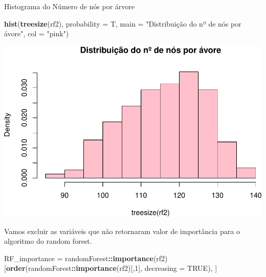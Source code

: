 \documentclass[]{article}
\newenvironment{Shaded}{\begin{snugshade}}{\end{snugshade}}
\newcommand{\KeywordTok}[1]{\textcolor[rgb]{0.13,0.29,0.53}{\textbf{#1}}}
\newcommand{\DataTypeTok}[1]{\textcolor[rgb]{0.13,0.29,0.53}{#1}}
\newcommand{\DecValTok}[1]{\textcolor[rgb]{0.00,0.00,0.81}{#1}}
\newcommand{\StringTok}[1]{\textcolor[rgb]{0.31,0.60,0.02}{#1}}
\newcommand{\CommentTok}[1]{\textcolor[rgb]{0.56,0.35,0.01}{\textit{#1}}}
\newcommand{\OtherTok}[1]{\textcolor[rgb]{0.56,0.35,0.01}{#1}}
\newcommand{\OperatorTok}[1]{\textcolor[rgb]{0.81,0.36,0.00}{\textbf{#1}}}
\newcommand{\NormalTok}[1]{#1}
\begin{document}
Histograma do Número de nós por árvore

\begin{Shaded}
\begin{Highlighting}[]
\KeywordTok{hist}\NormalTok{(}\KeywordTok{treesize}\NormalTok{(rf2), }\DataTypeTok{probability =}\NormalTok{ T,}
     \DataTypeTok{main =} \StringTok{"Distribuição do nº de nós por ávore"}\NormalTok{,}
     \DataTypeTok{col =} \StringTok{"pink"}\NormalTok{)}
\end{Highlighting}
\end{Shaded}

\includegraphics{markdown_v42_files/figure-latex/unnamed-chunk-92-1.pdf}

Vamos excluir as variáveis que não retornaram valor de importância para
o algoritmo do random forest.

\begin{Shaded}
\begin{Highlighting}[]
\NormalTok{RF_importance =}\StringTok{ }\NormalTok{randomForest}\OperatorTok{::}\KeywordTok{importance}\NormalTok{(rf2)[}\KeywordTok{order}\NormalTok{(randomForest}\OperatorTok{::}\KeywordTok{importance}\NormalTok{(rf2)[,}\DecValTok{1}\NormalTok{], }\DataTypeTok{decreasing =} \OtherTok{TRUE}\NormalTok{), ]}
\end{Highlighting}
\end{Shaded}

\begin{Shaded}
\end{Shaded}
\end{document}
